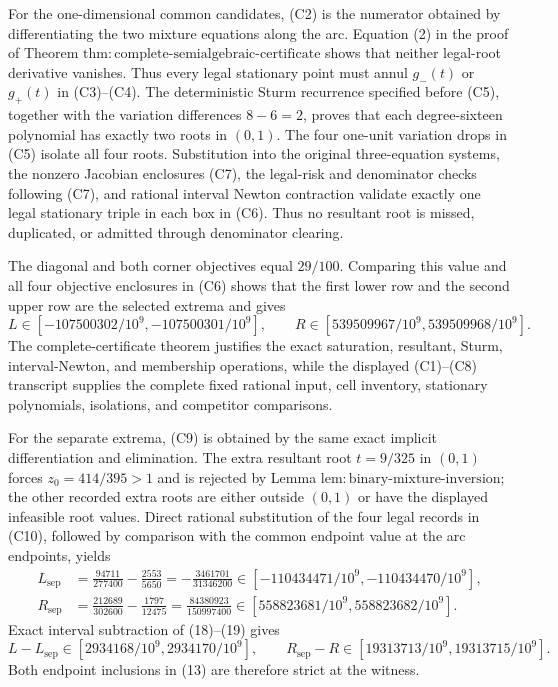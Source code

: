For the one-dimensional common candidates, (C2) is the numerator obtained by differentiating the two mixture equations along the arc.  Equation (2) in the proof of Theorem \(\mathrm{thm{:}complete\text{-}semialgebraic\text{-}certificate}\) shows that neither legal-root derivative vanishes.  Thus every legal stationary point must annul \(g_-(t)\) or \(g_+(t)\) in (C3)--(C4).  The deterministic Sturm recurrence specified before (C5), together with the variation differences \(8-6=2\), proves that each degree-sixteen polynomial has exactly two roots in \((0,1)\).  The four one-unit variation drops in (C5) isolate all four roots.  Substitution into the original three-equation systems, the nonzero Jacobian enclosures (C7), the legal-risk and denominator checks following (C7), and rational interval Newton contraction validate exactly one legal stationary triple in each box in (C6).  Thus no resultant root is missed, duplicated, or admitted through denominator clearing.

The diagonal and both corner objectives equal \(29/100\).  Comparing this value and all four objective enclosures in (C6) shows that the first lower row and the second upper row are the selected extrema and gives
\[
 L\in[-107500302/10^9,-107500301/10^9],
 \qquad
 R\in[539509967/10^9,539509968/10^9].                                  \tag{18}
\]
The complete-certificate theorem justifies the exact saturation, resultant, Sturm, interval-Newton, and membership operations, while the displayed (C1)--(C8) transcript supplies the complete fixed rational input, cell inventory, stationary polynomials, isolations, and competitor comparisons.

For the separate extrema, (C9) is obtained by the same exact implicit differentiation and elimination.  The extra resultant root \(t=9/325\) in \((0,1)\) forces \(z_0=414/395>1\) and is rejected by Lemma \(\mathrm{lem{:}binary\text{-}mixture\text{-}inversion}\); the other recorded extra roots are either outside \((0,1)\) or have the displayed infeasible root values.  Direct rational substitution of the four legal records in (C10), followed by comparison with the common endpoint value at the arc endpoints, yields
\[
\begin{aligned}
 L_{\mathrm{sep}}
 &=\frac{94711}{277400}-\frac{2553}{5650}
 =-\frac{3461701}{31346200}
 \in[-110434471/10^9,-110434470/10^9],\\
 R_{\mathrm{sep}}
 &=\frac{212689}{302600}-\frac{1797}{12475}
 =\frac{84380923}{150997400}
 \in[558823681/10^9,558823682/10^9].
\end{aligned}                                                           \tag{19}
\]
Exact interval subtraction of (18)--(19) gives
\[
 L-L_{\mathrm{sep}}
 \in[2934168/10^9,2934170/10^9],
 \qquad
 R_{\mathrm{sep}}-R
 \in[19313713/10^9,19313715/10^9].                                     \tag{20}
\]
Both endpoint inclusions in (13) are therefore strict at the witness.

